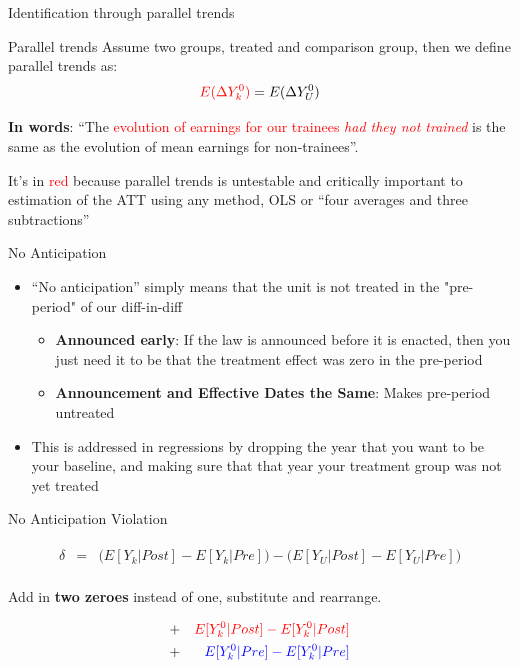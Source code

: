 \documentclass{beamer}
\begin{document}
\begin{frame}{Identification through parallel trends}
	

	\begin{block}{Parallel trends}
	Assume two groups, treated and comparison group, then we define parallel trends as:	 $$\textcolor{red}{E(}\textcolor{red}{\Delta Y^0_k)} = E(\Delta Y^0_U)$$
	\end{block}

\textbf{In words}: ``The \textcolor{red}{evolution of earnings for our trainees \emph{had they not trained}} is the same as the evolution of mean earnings for non-trainees''.  

\bigskip

It's in \textcolor{red}{red} because parallel trends is untestable and critically important to estimation of the ATT using any method, OLS or ``four averages and three subtractions''

\end{frame}

\begin{frame}{No Anticipation}

\begin{itemize}
\item ``No anticipation'' simply means that the unit is not treated in the "pre-period" of our diff-in-diff
	\begin{itemize}
	\item \textbf{Announced early}: If the law is announced before it is enacted, then you just need it to be that the treatment effect was zero in the pre-period
	\item \textbf{Announcement and Effective Dates the Same}: Makes pre-period untreated
	\end{itemize}
\item This is addressed in regressions by dropping the year that you want to be your baseline, and making sure that that year your treatment group was not yet treated
	
\end{itemize}

\end{frame}


\begin{frame}{No Anticipation Violation}


\begin{eqnarray*}
\widehat{\delta} &=& \bigg ( E[Y_k|Post] - E[Y_k|Pre] \bigg ) - \bigg ( E[Y_U | Post ] - E[ Y_U | Pre] \bigg) \\
\end{eqnarray*}

\bigskip

Add in \textbf{two zeroes} instead of one, substitute and rearrange.

\begin{eqnarray*}
&+& \textcolor{red}{E[Y^0_k|Post] - E[Y^0_k|Post]} \\
&+& \textcolor{blue}{E[Y^0_k|Pre] - E[Y^0_k|Pre]} 
\end{eqnarray*}

\end{frame}
\end{document}
